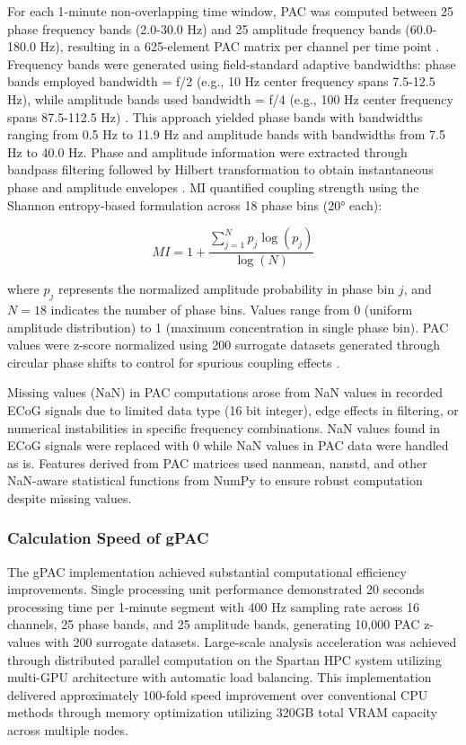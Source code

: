 	For each 1-minute non-overlapping time window, PAC was computed between 25 phase frequency bands (2.0-30.0 Hz) and 25 amplitude frequency bands (60.0-180.0 Hz), resulting in a 625-element PAC matrix per channel per time point \cite{Hlsemann2019QuantificationOPA,Munia2019TimeFrequencyBPK}. Frequency bands were generated using field-standard adaptive bandwidths: phase bands employed bandwidth = f/2 (e.g., 10 Hz center frequency spans 7.5-12.5 Hz), while amplitude bands used bandwidth = f/4 (e.g., 100 Hz center frequency spans 87.5-112.5 Hz) \cite{Tort2010MeasuringPCE}. This approach yielded phase bands with bandwidths ranging from 0.5 Hz to 11.9 Hz and amplitude bands with bandwidths from 7.5 Hz to 40.0 Hz. Phase and amplitude information were extracted through bandpass filtering followed by Hilbert transformation to obtain instantaneous phase and amplitude envelopes \cite{Canolty2010TheFRC}. MI quantified coupling strength using the Shannon entropy-based formulation across 18 phase bins (20° each):

\begin{equation}
MI = 1 + \frac{\sum_{j=1}^{N} p_j \log(p_j)}{\log(N)}
\end{equation}

where $p_j$ represents the normalized amplitude probability in phase bin $j$, and $N = 18$ indicates the number of phase bins. Values range from 0 (uniform amplitude distribution) to 1 (maximum concentration in single phase bin). PAC values were z-score normalized using 200 surrogate datasets generated through circular phase shifts to control for spurious coupling effects \cite{Tort2010MeasuringPCE,Jensen2016DiscriminatingVFR}.

	Missing values (NaN) in PAC computations arose from NaN values in recorded ECoG signals due to limited data type (16 bit integer), edge effects in filtering, or numerical instabilities in specific frequency combinations. NaN values found in ECoG signals were replaced with 0 while NaN values in PAC data were handled as is. Features derived from PAC matrices used nanmean, nanstd, and other NaN-aware statistical functions from NumPy to ensure robust computation despite missing values.

\subsubsection{Calculation Speed of gPAC}

The gPAC implementation achieved substantial computational efficiency improvements. Single processing unit performance demonstrated 20 seconds processing time per 1-minute segment with 400 Hz sampling rate across 16 channels, 25 phase bands, and 25 amplitude bands, generating 10,000 PAC z-values with 200 surrogate datasets. Large-scale analysis acceleration was achieved through distributed parallel computation on the Spartan HPC system utilizing multi-GPU architecture with automatic load balancing. This implementation delivered approximately 100-fold speed improvement over conventional CPU methods through memory optimization utilizing 320GB total VRAM capacity across multiple nodes.


